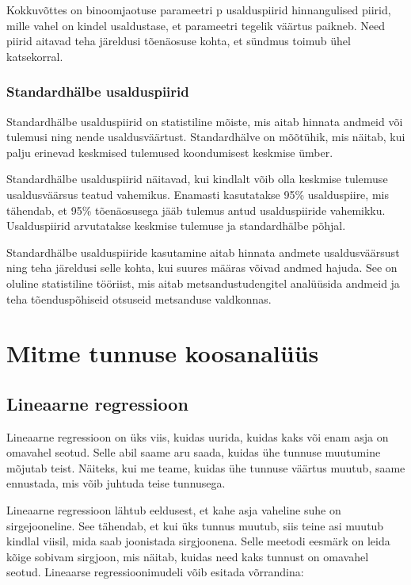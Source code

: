 \documentclass[
]{book}
\begin{document}
Kokkuvõttes on binoomjaotuse parameetri p usalduspiirid hinnangulised piirid, mille vahel on kindel usaldustase, et parameetri tegelik väärtus paikneb. Need piirid aitavad teha järeldusi tõenäosuse kohta, et sündmus toimub ühel katsekorral.

\subsection{Standardhälbe usalduspiirid}\label{standardhuxe4lbe-usalduspiirid}

Standardhälbe usalduspiirid on statistiline mõiste, mis aitab hinnata andmeid või tulemusi ning nende usaldusväärtust. Standardhälve on mõõtühik, mis näitab, kui palju erinevad keskmised tulemused koondumisest keskmise ümber.

Standardhälbe usalduspiirid näitavad, kui kindlalt võib olla keskmise tulemuse usaldusväärsus teatud vahemikus. Enamasti kasutatakse 95\% usalduspiire, mis tähendab, et 95\% tõenäosusega jääb tulemus antud usalduspiiride vahemikku. Usalduspiirid arvutatakse keskmise tulemuse ja standardhälbe põhjal.

Standardhälbe usalduspiiride kasutamine aitab hinnata andmete usaldusväärsust ning teha järeldusi selle kohta, kui suures määras võivad andmed hajuda. See on oluline statistiline tööriist, mis aitab metsandustudengitel analüüsida andmeid ja teha tõenduspõhiseid otsuseid metsanduse valdkonnas.

\chapter{Mitme tunnuse koosanalüüs}\label{mitme-tunnuse-koosanaluxfcuxfcs}

\section{Lineaarne regressioon}\label{lineaarne-regressioon}

Lineaarne regressioon on üks viis, kuidas uurida, kuidas kaks või enam asja on omavahel seotud. Selle abil saame aru saada, kuidas ühe tunnuse muutumine mõjutab teist. Näiteks, kui me teame, kuidas ühe tunnuse väärtus muutub, saame ennustada, mis võib juhtuda teise tunnusega.

Lineaarne regressioon lähtub eeldusest, et kahe asja vaheline suhe on sirgejooneline. See tähendab, et kui üks tunnus muutub, siis teine asi muutub kindlal viisil, mida saab joonistada sirgjoonena. Selle meetodi eesmärk on leida kõige sobivam sirgjoon, mis näitab, kuidas need kaks tunnust on omavahel seotud. Lineaarse regressioonimudeli võib esitada võrrandina:
\end{document}
